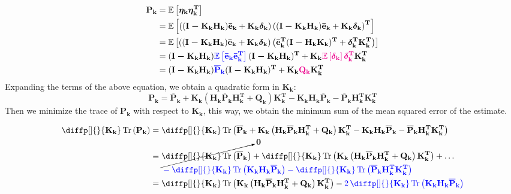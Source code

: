 \documentclass[12pt]{article}
\newcommand{\bvec}[1]{\boldsymbol{\mathbf{#1}}} %
\newcommand{\bvecT}[1]{\boldsymbol{\mathbf{#1^T}}} %
\newcommand{\mat}[1]{\boldsymbol{\mathbf{#1}}}
\newcommand{\matT}[1]{\boldsymbol{\mathbf{#1^T}}}
\newcommand{\brac}[1]{\left[#1\right]} %
\newcommand{\parentheses}[1]{\left(#1\right)}
\newcommand{\expv}[1]{\mathbb{E}\brac{#1}} %
\DeclareMathOperator{\Tr}{Tr}
\newcommand{\mytr}[1]{\Tr\parentheses{#1}}
\newcommand{\blue}[1]{\color{blue}#1\color{black}}
\newcommand{\magenta}[1]{\color{magenta}#1\color{black}}
\begin{document}
\begin{equation}
\begin{aligned}
    \mat{P_k} &= \expv{\bvec{\eta_k} 
        \bvecT{\eta_k}}\\
    &= \expv{\parentheses{(\mat{I - K_k H_k})\bvec{\bar{e}_k}
    + \mat{K_k}\bvec{\delta_k}} \parentheses{(\mat{I - K_k H_k})
    \bvec{\bar{e}_k} 
    + \mat{K_k}\bvec{\delta_k}}^\mathbf{T}}\\
    &= \expv{\parentheses{(\mat{I - K_k H_k})\bvec{\bar{e}_k}
    + \mat{K_k}\bvec{\delta_k}} \parentheses{\bvecT{\bar{e}_k}
    (\mat{I - H_k K_k})^\mathbf{T} 
    + \bvecT{\delta_k}\matT{K_k}}}\\
    &= (\mat{I - K_k H_k})\blue{\expv{\bvec{\bar{e}_k} 
    \bvecT{\bar{e}_k}}}(\mat{I - K_k H_k})^\mathbf{T} 
    + \mat{K_k}\magenta{\expv{\bvec{\delta_k}} \bvecT{\delta_k}}\matT{K_k}\\
    &= (\mat{I - K_k H_k})\blue{\mat{\overline{P}_k}}(\mat{I - K_k H_k})^\mathbf{T} 
    + \mat{K_k}\magenta{\mat{Q_k}}\matT{K_k}
\end{aligned}
\label{eq:ekf-estimate-error-covariance}
\end{equation}
Expanding the terms of the above equation, we obtain a quadratic form
in $\mat{K_k}$:
\begin{equation}
    \mat{P_k} = \mat{\overline{P}_k} + \mat{K_k}
    \parentheses{\mat{H_k \overline{P}_k}\matT{H_k} + \mat{Q_k}}
    \matT{K_k} - \mat{K_k H_k \overline{P}_k} 
    - \mat{\overline{P}_k H_k^T K_k^T}
\end{equation}
Then we minimize the trace of $\mat{P_k}$ with respect to 
$\mat{K_k}$, this way, we obtain the minimum sum of the mean 
squared error of the estimate. 

\begin{equation}
\begin{aligned}
    \diffp[]{}{\mat{K_k}} \mytr{\mat{P_k}} &= 
    \diffp[]{}{\mat{K_k}} \Tr \parentheses{\mat{\overline{P}_k} 
    + \mat{K_k} \parentheses{\mat{H_k \overline{P}_k}\matT{H_k} 
    + \mat{Q_k}} \matT{K_k} - \mat{K_k H_k \overline{P}_k}
    - \mat{\overline{P}_k H_k^T K_k^T}}\\
    &= \begin{aligned}
        &\cancelto{\mat{0}}{ \diffp[]{}{\mat{K_k}}
        \mytr{\mat{\overline{P}_k}}} + \diffp[]{}{\mat{K_k}}\mytr{
        \mat{K_k} \parentheses{\mat{H_k \overline{P}_k}
        \matT{H_k} + \mat{Q_k}} \matT{K_k}} + \dots\\
        & \blue{-\diffp[]{}{\mat{K_k}} \mytr{\mat{K_k H_k 
        \overline{P}_k}} -\diffp[]{}{\mat{K_k}}\mytr{\mat{
        \mat{\overline{P}_k H_k^T K_k^T}}}}
    \end{aligned} \\
    &= \diffp[]{}{\mat{K_k}}\mytr{
        \mat{K_k} \parentheses{\mat{H_k \overline{P}_k}
        \matT{H_k} + \mat{Q_k}} \matT{K_k}} - \blue{2\,
        \diffp[]{}{\mat{K_k}} \mytr{\mat{K_k H_k\overline{P}_k}}}
\end{aligned}
\end{equation}
\end{document}
